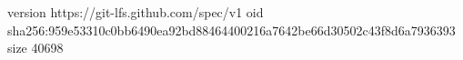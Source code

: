 version https://git-lfs.github.com/spec/v1
oid sha256:959e53310c0bb6490ea92bd88464400216a7642be66d30502c43f8d6a7936393
size 40698
